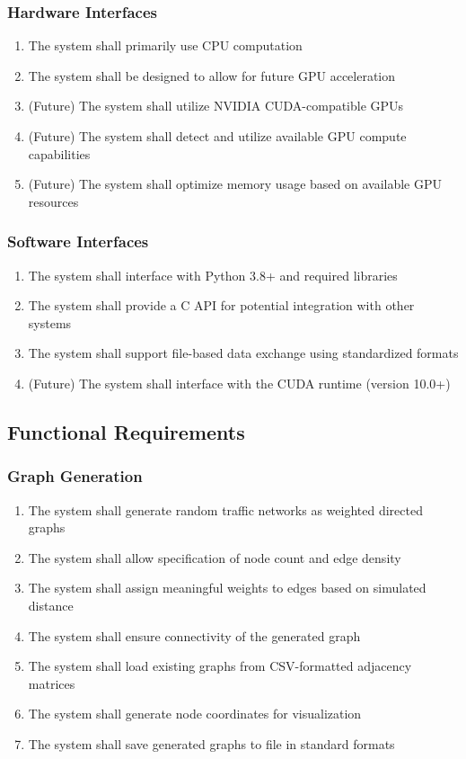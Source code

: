 \documentclass[conference]{IEEEtran}
\begin{document}
\subsubsection{Hardware Interfaces}
\begin{enumerate}
    \item The system shall primarily use CPU computation
    \item The system shall be designed to allow for future GPU acceleration
    \item (Future) The system shall utilize NVIDIA CUDA-compatible GPUs
    \item (Future) The system shall detect and utilize available GPU compute capabilities
    \item (Future) The system shall optimize memory usage based on available GPU resources
\end{enumerate}

\subsubsection{Software Interfaces}
\begin{enumerate}
    \item The system shall interface with Python 3.8+ and required libraries
    \item The system shall provide a C API for potential integration with other systems
    \item The system shall support file-based data exchange using standardized formats
    \item (Future) The system shall interface with the CUDA runtime (version 10.0+)
\end{enumerate}

\subsection{Functional Requirements}

\subsubsection{Graph Generation}
\begin{enumerate}
    \item The system shall generate random traffic networks as weighted directed graphs
    \item The system shall allow specification of node count and edge density
    \item The system shall assign meaningful weights to edges based on simulated distance
    \item The system shall ensure connectivity of the generated graph
    \item The system shall load existing graphs from CSV-formatted adjacency matrices
    \item The system shall generate node coordinates for visualization
    \item The system shall save generated graphs to file in standard formats
\end{enumerate}
\end{document}

